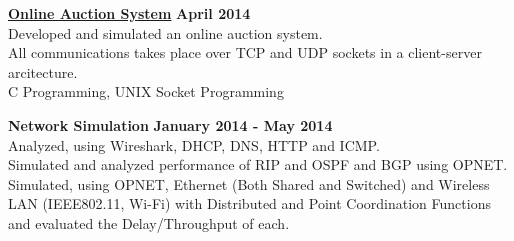 \documentclass[margin,line]{resume}
\begin{document}
\begin{resume}
    \textbf{\listing \href{https://github.com/bmyfish/Online-Auction-System}{Online Auction System}} \hfill \textbf{April 2014}\vspace{2mm}\\
    Developed and simulated an online auction system.\\
    All communications takes place over TCP and UDP sockets in a client-server arcitecture.\\
    C Programming, UNIX Socket Programming
    
    \textbf{\listing Network Simulation} \hfill \textbf{January 2014 - May 2014}\vspace{2mm}\\
    Analyzed, using Wireshark, DHCP, DNS, HTTP and ICMP.\\
    Simulated and analyzed performance of RIP and OSPF and BGP using OPNET.\\
    Simulated, using OPNET, Ethernet (Both Shared and Switched) and Wireless LAN (IEEE802.11, Wi-Fi) with Distributed and Point Coordination Functions and evaluated the Delay/Throughput of each.
    

	
\end{resume}
\end{document}
